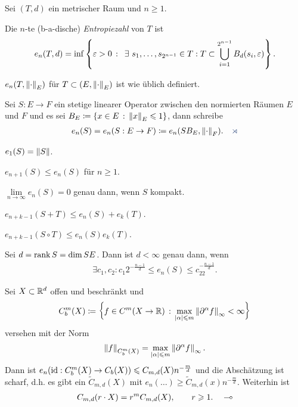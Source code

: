 \begin{defn}
\label{defn:4.2.2}
Sei $(T,d)$ ein metrischer Raum und $n\ge 1$.
\begin{defnenum}
\item Die $n$-te (b-a-dische) \emph{Entropiezahl} von $T$
ist
\begin{align*}
e_n(T,d) = \inf\setdef{\ep >0}{\exists s_1,\ldots,s_{2^{n-1}}\in T :
T\subset\bigcup_{i=1}^{2^{n-1}} B_d(s_i,\ep)}.
\end{align*}
\item $e_n(T,\left\|\cdot\right\|_E)$ für $T\subset (E,\left\|\cdot\right\|_E)$ ist wie üblich
definiert.
\item Sei $S: E\to F$ ein stetige linearer Operator zwischen den normierten
Räumen $E$ und $F$ und es sei $B_E \coloneq \left\{ x\in E\,:\,\left\|x\right\|_E \leqslant 1\right\}$, dann
schreibe
\begin{align*}
e_n(S) = e_n(S: E\to F) \defl e_n(SB_E,\norm{\cdot}_F).\fishhere
\end{align*}
\end{defnenum}
\end{defn}

\begin{bem*}
\begin{bemenum}
\item $e_1(S) = \left\|S\right\|$.
\item $e_{n+1}(S)\le e_n(S)$ für $n\ge 1$.
\item $\lim\limits_{n\to\infty} e_n(S) = 0$ genau dann, wenn $S$ kompakt.
\item $e_{n+k-1}(S+T) \le e_{n}(S) + e_k(T)$.
\item $e_{n+k-1}(S\circ T) \le e_n(S)e_k(T)$.
\item Sei $d=\operatorname{rank} S = \dim SE$. Dann ist $d<\infty$ genau dann, wenn
\begin{align*}
\exists c_1,c_2 : c_1 2^{-\frac{n-1}{d}} \le e_n(S) \le c_22^{-\frac{n-1}{d}}.
\end{align*}
\item Sei $X\subset \mathbb{R}^d$ offen und beschränkt und
\begin{align*}
C_b^m(X) \coloneq \left\{ f \in C^m(X\to \mathbb{R})\,:\,\max_{\left|\alpha\right|\leqslant m}
\left\|\partial^\alpha f\right\|_\infty < \infty\right\}
\end{align*}
versehen mit der Norm
\begin{align*}
\left\|f\right\|_{C_b^m(X)} = \max_{\left|\alpha\right|\leqslant m} \left\|\partial^\alpha f\right\|_\infty.
\end{align*}
Dann ist $e_n(\operatorname{id}: C_b^m(X)\to C_b(X)) \leqslant C_{m,d}(X)n^{-\frac{m}{d}}$ und die
Abschätzung ist scharf, d.h. es gibt ein $\tilde{C}_{m,d}(X)$ mit $e_n(\ldots)
\ge \tilde{C}_{m,d}(x)n^{-\frac{m}{d}}$. Weiterhin ist
\begin{align*}
C_{m,d}(r\cdot X) = r^m C_{m,d}(X),\qquad r\geqslant 1.\quad\multimap
\end{align*}
\end{bemenum}
\end{bem*}

